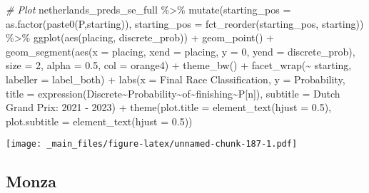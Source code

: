 \documentclass[
]{book}
\newenvironment{Shaded}{\begin{snugshade}}{\end{snugshade}}
\newcommand{\AttributeTok}[1]{\textcolor[rgb]{0.77,0.63,0.00}{#1}}
\newcommand{\CommentTok}[1]{\textcolor[rgb]{0.56,0.35,0.01}{\textit{#1}}}
\newcommand{\DecValTok}[1]{\textcolor[rgb]{0.00,0.00,0.81}{#1}}
\newcommand{\FloatTok}[1]{\textcolor[rgb]{0.00,0.00,0.81}{#1}}
\newcommand{\FunctionTok}[1]{\textcolor[rgb]{0.00,0.00,0.00}{#1}}
\newcommand{\NormalTok}[1]{#1}
\newcommand{\SpecialCharTok}[1]{\textcolor[rgb]{0.00,0.00,0.00}{#1}}
\newcommand{\StringTok}[1]{\textcolor[rgb]{0.31,0.60,0.02}{#1}}
\begin{document}
\begin{Shaded}
\begin{Highlighting}[]
\CommentTok{\# Plot}
\NormalTok{netherlands\_preds\_se\_full }\SpecialCharTok{\%\textgreater{}\%}
  \FunctionTok{mutate}\NormalTok{(}\AttributeTok{starting\_pos =} \FunctionTok{as.factor}\NormalTok{(}\FunctionTok{paste0}\NormalTok{(}\StringTok{\textquotesingle{}P\textquotesingle{}}\NormalTok{,starting)),}
         \AttributeTok{starting\_pos =} \FunctionTok{fct\_reorder}\NormalTok{(starting\_pos, starting)) }\SpecialCharTok{\%\textgreater{}\%}
  \FunctionTok{ggplot}\NormalTok{(}\FunctionTok{aes}\NormalTok{(placing, discrete\_prob)) }\SpecialCharTok{+}
  \FunctionTok{geom\_point}\NormalTok{() }\SpecialCharTok{+}
  \FunctionTok{geom\_segment}\NormalTok{(}\FunctionTok{aes}\NormalTok{(}\AttributeTok{x =}\NormalTok{ placing, }\AttributeTok{xend =}\NormalTok{ placing, }\AttributeTok{y =} \DecValTok{0}\NormalTok{, }\AttributeTok{yend =}\NormalTok{ discrete\_prob),}
               \AttributeTok{size =} \DecValTok{2}\NormalTok{, }\AttributeTok{alpha =} \FloatTok{0.5}\NormalTok{, }\AttributeTok{col =} \StringTok{\textquotesingle{}orange4\textquotesingle{}}\NormalTok{) }\SpecialCharTok{+}
  \FunctionTok{theme\_bw}\NormalTok{() }\SpecialCharTok{+}
  \FunctionTok{facet\_wrap}\NormalTok{(}\SpecialCharTok{\textasciitilde{}}\NormalTok{ starting, }\AttributeTok{labeller =}\NormalTok{ label\_both) }\SpecialCharTok{+}
  \FunctionTok{labs}\NormalTok{(}\AttributeTok{x =} \StringTok{\textquotesingle{}Final Race Classification\textquotesingle{}}\NormalTok{,}
       \AttributeTok{y =} \StringTok{\textquotesingle{}Probability\textquotesingle{}}\NormalTok{,}
       \AttributeTok{title =} \FunctionTok{expression}\NormalTok{(Discrete}\SpecialCharTok{\textasciitilde{}}\NormalTok{Probability}\SpecialCharTok{\textasciitilde{}}\NormalTok{of}\SpecialCharTok{\textasciitilde{}}\NormalTok{finishing}\SpecialCharTok{\textasciitilde{}}\NormalTok{P[n]),}
       \AttributeTok{subtitle =} \StringTok{\textquotesingle{}Dutch Grand Prix: 2021 {-} 2023\textquotesingle{}}\NormalTok{) }\SpecialCharTok{+}
  \FunctionTok{theme}\NormalTok{(}\AttributeTok{plot.title =} \FunctionTok{element\_text}\NormalTok{(}\AttributeTok{hjust =} \FloatTok{0.5}\NormalTok{),}
        \AttributeTok{plot.subtitle =} \FunctionTok{element\_text}\NormalTok{(}\AttributeTok{hjust =} \FloatTok{0.5}\NormalTok{)) }
\end{Highlighting}
\end{Shaded}

\texttt{[image: \_main\_files/figure-latex/unnamed-chunk-187-1.pdf]}

\hypertarget{monza}{%
\subsection{Monza}\label{monza}}
\end{document}
